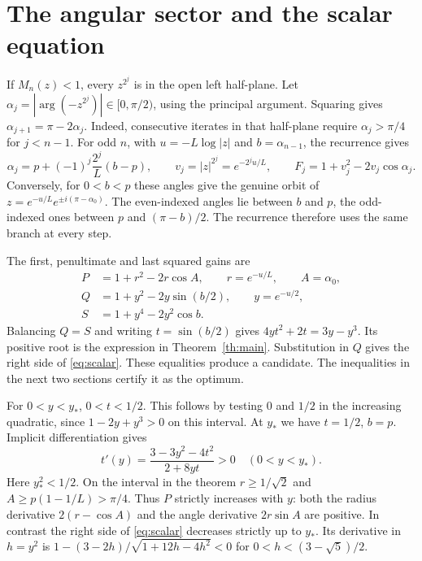 \documentclass[11pt,letterpaper]{article}
\newcommand{\head}[1]{\par\medskip{\large\bfseries\color{ink}#1}\par\smallskip}
\begin{document}
\newpage
\section{The angular sector and the scalar equation}
If \(M_n(z)<1\), every \(z^{2^j}\) is in the open left half-plane. Let
\(\alpha_j=|\arg(-z^{2^j})|\in[0,\pi/2)\), using the principal argument.
Squaring gives \(\alpha_{j+1}=\pi-2\alpha_j\). Indeed, consecutive iterates
in that half-plane require \(\alpha_j>\pi/4\) for \(j<n-1\). For odd \(n\),
with \(u=-L\log |z|\) and \(b=\alpha_{n-1}\), the recurrence gives
\begin{equation}\label{eq:angles}
  \alpha_j=p+(-1)^j\frac{2^j}{L}(b-p),\qquad
  v_j=|z|^{2^j}=e^{-2^j u/L},\qquad
  F_j=1+v_j^2-2v_j\cos\alpha_j .
\end{equation}
Conversely, for \(0<b<p\) these angles give the genuine orbit of
\(z=e^{-u/L}e^{\pm i(\pi-\alpha_0)}\). The even-indexed angles lie between
\(b\) and \(p\), the odd-indexed ones between \(p\) and
\((\pi-b)/2\). The recurrence therefore uses the same branch at every step.

The first, penultimate and last squared gains are
\begin{equation}\label{eq:pqs}
\begin{split}
 P&=1+r^2-2r\cos A,\qquad r=e^{-u/L},\qquad A=\alpha_0,\\
 Q&=1+y^2-2y\sin(b/2),\qquad y=e^{-u/2},\\
 S&=1+y^4-2y^2\cos b .
\end{split}
\end{equation}
Balancing \(Q=S\) and writing \(t=\sin(b/2)\) gives
\(4yt^2+2t=3y-y^3\). Its positive root is the expression in
Theorem~\ref{th:main}. Substitution in \(Q\) gives the right side of
\eqref{eq:scalar}. These equalities produce a candidate. The inequalities
in the next two sections certify it as the optimum.

\head{Uniqueness of the root}
For \(0<y<y_*\), \(0<t<1/2\). This follows by testing \(0\) and \(1/2\)
in the increasing quadratic, since \(1-2y+y^3>0\) on this interval.
At \(y_*\) we have \(t=1/2\), \(b=p\). Implicit differentiation gives
\[
 t'(y)=\frac{3-3y^2-4t^2}{2+8yt}>0\quad(0<y<y_*) .
\]
Here \(y_*^2<1/2\). On the interval in the theorem \(r\ge1/\sqrt2\) and
\(A\ge p(1-1/L)>\pi/4\). Thus \(P\) strictly increases with \(y\):
both the radius derivative \(2(r-\cos A)\) and the angle derivative
\(2r\sin A\) are positive. In contrast the right side of \eqref{eq:scalar}
decreases strictly up to \(y_*\). Its derivative in \(h=y^2\) is
\(1-(3-2h)/\sqrt{1+12h-4h^2}<0\) for \(0<h<(3-\sqrt5)/2\).
\end{document}
